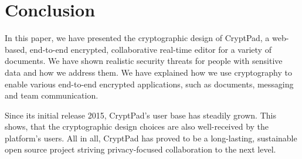 \section{Conclusion}
\label{sec:conclusion}

In this paper, we have presented the cryptographic design of CryptPad, a web-based, end-to-end encrypted, collaborative real-time editor for a variety of documents.
We have shown realistic security threats for people with sensitive data and how we address them.
We have explained how we use cryptography to enable various end-to-end encrypted applications, such as documents, messaging and team communication.

Since its initial release 2015, CryptPad's user base has steadily grown.
This shows, that the cryptographic design choices are also well-received by the platform's users.
All in all, CryptPad has proved to be a long-lasting, sustainable open source project striving privacy-focused collaboration to the next level.
